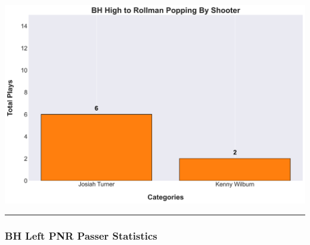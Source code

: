 \documentclass[a4paper,12pt]{article}
\begin{document}
\begin{table}[H]
{\begin{minipage}[t]{0.6\textwidth}
{\begin{tabular}
                
            
                
            
                
            
                
            
                
            
                
            
                
            
                
            
                
            

            \bottomrule
        \end{tabular}
        } %
    \end{minipage}
    } %
    \hfill %
    \begin{minipage}[c]{0.35\textwidth} %
        \flushright
        \includegraphics[width=\textwidth, height=.14\textheight]{images/PNR_PassHighPopsPlayer_Freq.png} %
    \end{minipage}
\end{table}

\vspace{-1em} %
\hrule height 1pt width 1\textwidth %
\vspace{1 em} %

\subsubsection{BH Left PNR Passer Statistics}
\end{document}
